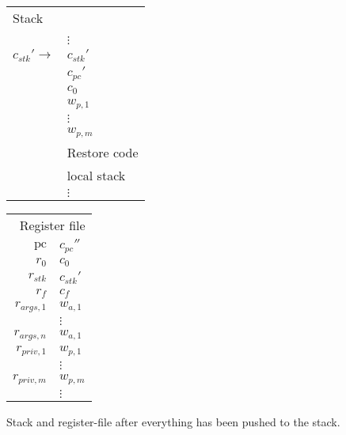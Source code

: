 \documentclass[a4paper]{article}
\newcommand{\var}[1]{\mathit{#1}}
\newcommand{\pc}{\mathit{pc}}
\newcommand{\pcreg}{\mathrm{pc}}
\begin{document}
\begin{figure}
  \label{fig:stack-after-push}
  \centering
  \begin{tabular}[!h]{r | >{\raggedright\arraybackslash}p{3cm} |}
\multicolumn{2}{l}{Stack} \\
\cline{2-2}
   & \\
   & $\vdots$\\
\cline{2-2}
$c_{\var{stk}}' \rightarrow$  & $c_{\var{stk}}'$ \\
\cline{2-2}
   & $c_\pc'$ \\
\cline{2-2}
   & $c_0$ \\
\cline{2-2}
   & $w_{p,1}$ \\
\cline{2-2}
   & $\vdots$ \\
\cline{2-2}
   & $w_{p,m}$ \\
\cline{2-2}
   & Restore code \\
\cline{2-2}
   & local stack\\
   & $\vdots$ \\
\cline{2-2}
\end{tabular}
\hspace{1cm}
\begin{tabular}{r | >{\centering\arraybackslash}p{0.75cm} |}
\multicolumn{2}{r}{Register file} \\
\cline{2-2}
$\pcreg$ & $c_{\pc}''$\\
\cline{2-2}
$r_0$  & $c_0$ \\
\cline{2-2}
$r_{\var{stk}}$  & $c_{\var{stk}}'$ \\
\cline{2-2}
$r_f$ & $c_f$ \\
\cline{2-2}
$r_{\var{args},1}$ & $w_{a,1}$ \\
\cline{2-2}
& $\vdots$ \\
\cline{2-2}
$r_{\var{args},n}$ & $w_{a,1}$\\
\cline{2-2}
$r_{\var{priv},1}$ & $w_{p,1}$\\
\cline{2-2}
& $\vdots$ \\
\cline{2-2}
$r_{\var{priv},m}$ & $w_{p,m}$\\
\cline{2-2}
& $\vdots$ \\
\cline{2-2}
\end{tabular}
\caption{Stack and register-file after everything has been pushed to the stack.}
\end{figure}
\end{document}
